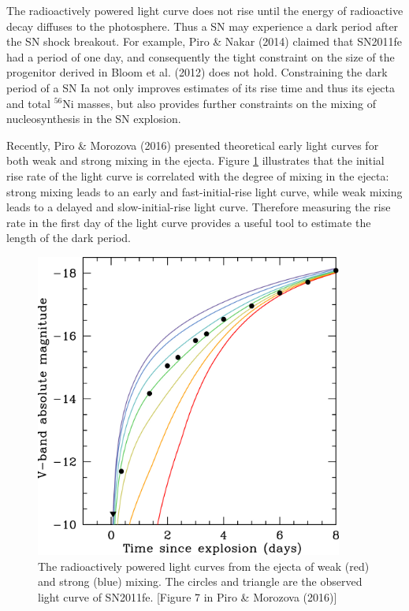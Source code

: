 \documentclass[11pt]{article}
\begin{document}
The radioactively powered light curve does not rise until the energy
of radioactive decay diffuses to the photosphere. Thus a SN may
experience a dark period after the SN shock breakout. For example,
Piro \& Nakar (2014) claimed that SN2011fe had a period of one day,
and consequently the tight constraint on the size of the progenitor
derived in Bloom et al. (2012) does not hold. Constraining the dark
period of a SN Ia not only improves estimates of its rise time and
thus its ejecta and total $^{56}$Ni masses, but also provides further
constraints on the mixing of nucleosynthesis in the SN explosion.

Recently, Piro \& Morozova (2016) presented theoretical early light
curves for both weak and strong mixing in the ejecta. Figure
\ref{fig:deposition} illustrates that the initial rise rate of the
light curve is correlated with the degree of mixing in the ejecta:
strong mixing leads to an early and fast-initial-rise light curve,
while weak mixing leads to a delayed and slow-initial-rise light
curve. Therefore measuring the rise rate in the first day of the light
curve provides a useful tool to estimate the length of the dark
period.

\begin{figure}[htb]
  \centering
  \includegraphics[width=0.9\textwidth]{deposition.jpg}
  \caption{The radioactively powered light curves from the ejecta of
    weak (red) and strong (blue) mixing. The circles and triangle are
    the observed light curve of SN2011fe. [Figure 7 in Piro \&
    Morozova (2016)] }
  \label{fig:deposition}
\end{figure}
\end{document}
